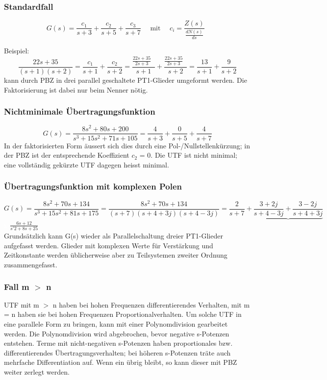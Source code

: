 \subsubsection{Standardfall}

\[ G(s) =\frac{c_{1}}{s+3} + \frac{c_{2}}{s+5} + \frac{c_{3}}{s+7} \quad \text{ mit } \quad {c_{i}= \frac{Z(s)}{\frac{dN(s)}{ds}}\mathop{\Bigg|_{s=p_{i}}}}\]

Beispiel: \[\frac{22s +35}{(s+1)(s+2)}=\frac{c_{1}}{s+1}+\frac{c_{2}}{s+2}=\frac{\frac{22s+35}{2s+3}\mathop{\Big|_{s=-1}}}{s+1}+\frac{\frac{22s+35}{2s+3}\mathop{\Big|_{s=-2}}}{s+2}=\frac{13}{s+1}+\frac{9}{s+2}\]
kann durch PBZ in drei parallel geschaltete PT1-Glieder umgeformt werden. Die
Faktorisierung ist dabei nur beim Nenner nötig.

\subsubsection{Nichtminimale Übertragungsfunktion}
\[G(s) =\frac{8s^{2} + 80s + 200}{s^3 + 15s^2 + 71s + 105}= \frac{4}{s+3} + \frac{0}{s+5} + \frac{4}{s+7}\]
In der faktorisierten Form äussert sich dies durch eine Pol-/Nullstellenkürzung; in der PBZ ist der entsprechende Koeffizient $c_{2}$ = 0. Die UTF ist nicht minimal; eine vollständig gekürzte UTF dagegen heisst minimal. \\

\subsubsection{Übertragungsfunktion mit komplexen Polen}
\[G(s) =\frac{8s^{2} + 70s + 134}{s^3 + 15s^2 + 81s + 175}= \frac{8s^2+70s+134}{(s+7)(s+4+3j)(s+4-3j)}=\frac{2}{s+7}+\underbrace{\frac{3+2j}{s+4-3j}+\frac{3-2j}{s+4+3j}}\]
\textcolor{white}{x} \hspace{14.5cm} $\frac{6s+12}{s'2+8s+25}$\\

Grundsätzlich kann G(s) wieder als Parallelschaltung dreier PT1-Glieder aufgefasst
werden. Glieder mit komplexen Werte für Verstärkung und Zeitkonstante werden
üblicherweise aber zu Teilsystemen zweiter Ordnung zusammengefasst.

\subsubsection{Fall m $>$ n}
UTF mit m $>$ n haben bei hohen Frequenzen differentierendes Verhalten, mit m = n
haben sie bei hohen Frequenzen Proportionalverhalten. Um solche UTF in eine
parallele Form zu bringen, kann mit einer Polynomdivision gearbeitet werden. Die Polynomdivision wird abgebrochen, bevor negative s-Potenzen entstehen. Terme mit nicht-negativen s-Potenzen haben proportionales
bzw. differentierendes Übertragungsverhalten; bei höheren s-Potenzen träte auch
mehrfache Differentiation auf. Wenn ein übrig bleibt, so kann dieser mit PBZ weiter zerlegt werden.

